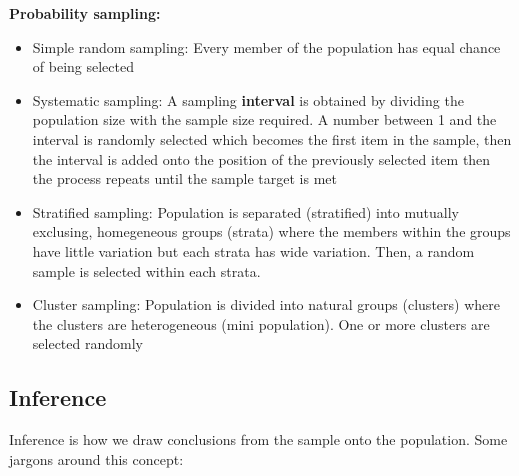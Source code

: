 \documentclass{article}
\begin{document}
\textbf{Probability sampling:}
\begin{itemize}
    \item Simple random sampling: Every member of the population has equal chance of being selected
    \item Systematic sampling: A sampling \textbf{interval} is obtained by dividing the population size with the sample size required. A number between 1 and the interval is randomly selected which becomes the first item in the sample, then the interval is added onto the position of the previously selected item then the process repeats until the sample target is met
    \item Stratified sampling: Population is separated (stratified) into mutually exclusing, homegeneous groups (strata) where the members within the groups have little variation but each strata has wide variation. Then, a random sample is selected within each strata.
    \item Cluster sampling: Population is divided into natural groups (clusters) where the clusters are heterogeneous (mini population). One or more clusters are selected randomly
\end{itemize}

\subsection{Inference}
Inference is how we draw conclusions from the sample onto the population. Some jargons around this concept:
\end{document}
